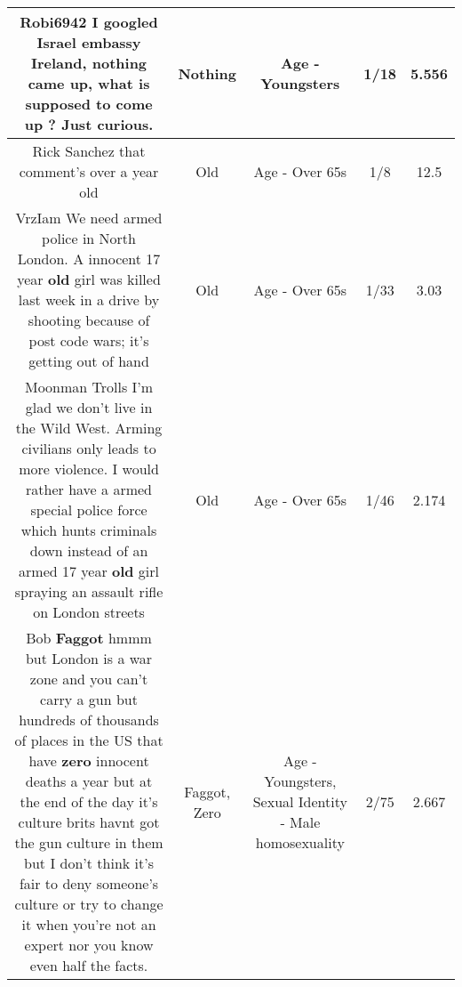 \documentclass[11pt]{article}
\newlength\mylength
\begin{document}
\begin{center}
\begin{longtable}{|C{.65\mylength}|C{.30\mylength}|C{.12\mylength}|C{.12\mylength}|C{.12\mylength}|}
  \small Robi6942 I googled Israel embassy Ireland, \textbf{nothing} came up, what is supposed to come up ? Just curious.\normalsize   & Nothing & Age - Youngsters & 1/18 & 5.556 \\  \hline
  \small Rick Sanchez that comment's over a year old\normalsize   & Old & Age - Over 65s & 1/8 & 12.5 \\  \hline
  \small VrzIam We need armed police in North London. A innocent 17 year \textbf{old} girl was killed last week in a drive by shooting because of post code wars; it's getting out of hand\normalsize   & Old & Age - Over 65s & 1/33 & 3.03 \\  \hline
  \small Moonman Trolls I'm glad we don't live in the Wild West. Arming civilians only leads to more violence. I would rather have a armed special police force which hunts criminals down instead of an armed 17 year \textbf{old} girl spraying an assault rifle on  London streets\normalsize   & Old & Age - Over 65s & 1/46 & 2.174 \\  \hline
  \small Bob \textbf{Faggot} hmmm but London is a war zone and you can't carry a gun but hundreds of thousands of places in the US that have \textbf{zero} innocent deaths a year but at the end of the day it's culture brits havnt got the gun culture in them but I don't think it's fair to deny someone's culture or try to change it when you're not an expert nor you know even half the facts.\normalsize   & Faggot, Zero & Age - Youngsters, Sexual Identity - Male homosexuality & 2/75 & 2.667 \\  \hline

\end{longtable}
\end{center}
\end{document}
